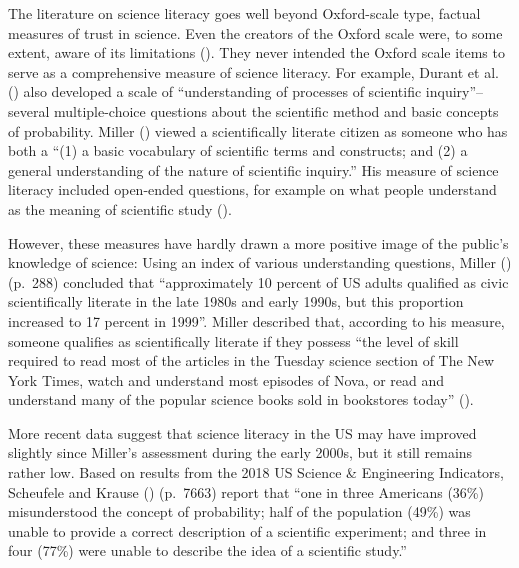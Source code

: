 \documentclass[
  jou,
  floatsintext,
  longtable,
  nolmodern,
  notxfonts,
  notimes,
  colorlinks=true,linkcolor=blue,citecolor=blue,urlcolor=blue]{apa7}
\begin{document}
The literature on science literacy goes well beyond Oxford-scale type,
factual measures of trust in science. Even the creators of the Oxford
scale were, to some extent, aware of its limitations
(). They never
intended the Oxford scale items to serve as a comprehensive measure of
science literacy. For example, Durant et al.
() also
developed a scale of ``understanding of processes of scientific
inquiry''--several multiple-choice questions about the scientific method
and basic concepts of probability. Miller
() viewed a
scientifically literate citizen as someone who has both a ``(1) a basic
vocabulary of scientific terms and constructs; and (2) a general
understanding of the nature of scientific inquiry.'' His measure of
science literacy included open-ended questions, for example on what
people understand as the meaning of scientific study
().

However, these measures have hardly drawn a more positive image of the
public's knowledge of science: Using an index of various understanding
questions, Miller
() (p.~288)
concluded that ``approximately 10 percent of US adults qualified as
civic scientifically literate in the late 1980s and early 1990s, but
this proportion increased to 17 percent in 1999''. Miller described
that, according to his measure, someone qualifies as scientifically
literate if they possess ``the level of skill required to read most of
the articles in the Tuesday science section of The New York Times, watch
and understand most episodes of Nova, or read and understand many of the
popular science books sold in bookstores today''
().

More recent data suggest that science literacy in the US may have
improved slightly since Miller's assessment during the early 2000s, but
it still remains rather low. Based on results from the 2018 US Science
\& Engineering Indicators, Scheufele and Krause
()
(p.~7663) report that ``one in three Americans (36\%) misunderstood the
concept of probability; half of the population (49\%) was unable to
provide a correct description of a scientific experiment; and three in
four (77\%) were unable to describe the idea of a scientific study.''
\end{document}
